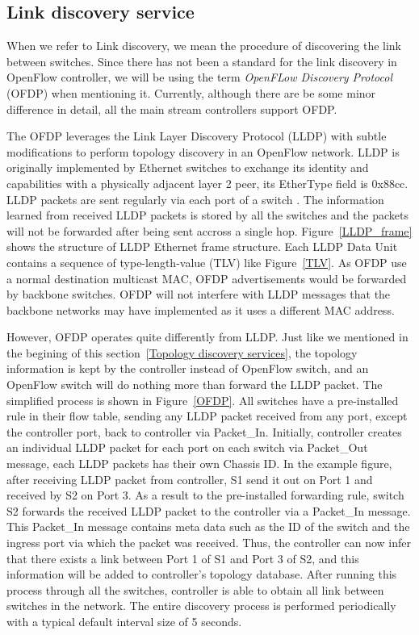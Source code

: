 \subsection{Link discovery service}
\label{Link discovery service}
When we refer to Link discovery, we mean the procedure of discovering the link between switches. Since there has not been a standard for the link discovery in OpenFlow controller, we will be using the term \textit{OpenFLow Discovery Protocol} (OFDP) when mentioning it. Currently, although there are be some minor difference in detail, all the main stream controllers support OFDP.

The OFDP leverages the Link Layer Discovery Protocol (LLDP) with subtle modifications to perform topology discovery in an OpenFlow network. LLDP is originally implemented by Ethernet switches to exchange its identity and capabilities with a physically adjacent layer 2 peer, its EtherType field is 0x88cc. LLDP packets are sent regularly via each port of a switch \cite{LLDP_WS}. The information learned from received LLDP packets is stored by all the switches and the packets will not be forwarded after being sent accross a single hop. Figure~\ref{LLDP_frame} shows the structure of LLDP Ethernet frame structure. Each LLDP Data Unit contains a sequence of type-length-value (TLV) like Figure~\ref{TLV}. As OFDP use a normal destination multicast MAC, OFDP advertisements would be forwarded by backbone switches. OFDP will not interfere with LLDP messages that the backbone networks may have implemented as it uses a different MAC address. \cite{OFDP_GENI}

However, OFDP operates quite differently from LLDP. Just like we mentioned in the begining of this section~\ref{Topology discovery services}, the topology information is kept by the controller instead of OpenFlow switch, and an OpenFlow switch will do nothing more than forward the LLDP packet. The simplified process is shown in Figure~\ref{OFDP}. All switches have a pre-installed rule in their flow table, sending any LLDP packet received from any port, except the controller port, back to controller via Packet_In. Initially, controller creates an individual LLDP packet for each port on each switch via Packet_Out message, each LLDP packets has their own Chassis ID. In the example figure, after receiving LLDP packet from controller, S1 send it out on Port 1 and received by S2 on Port 3. As a result to the pre-installed forwarding rule, switch S2 forwards the received LLDP packet to the controller via a Packet_In message. This Packet_In message contains meta data such as the ID of the switch and the ingress port via which the packet was received. Thus, the controller can now infer that there exists a link between Port 1 of S1 and Port 3 of S2, and this information will be added to controller's topology database. After running this process through all the switches, controller is able to obtain all link between switches in the network. The entire discovery process is performed periodically with a typical default interval size of 5 seconds. \cite{PPTI14}


